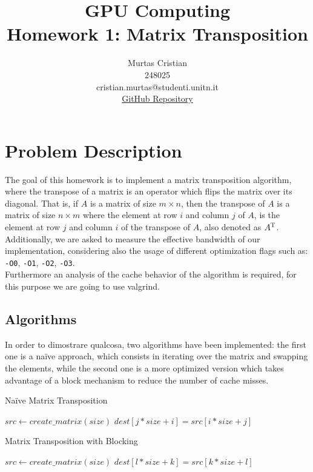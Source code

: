 \documentclass{article}
\title{\textbf{GPU Computing} \\
    \large Homework 1: Matrix Transposition \\
}
\author{Murtas Cristian \\ 248025 \\ cristian.murtas@studenti.unitn.it \\
\href{https://github.com/SecondarySkyler/gpu-computing/tree/main/matrix_transposition}{GitHub Repository}
}
\begin{document}
\maketitle

\section{Problem Description}
The goal of this homework is to implement a matrix transposition algorithm, where the transpose of a matrix
is an operator which flips the matrix over its diagonal. That is, if $A$ is a matrix of size $m \times n$, then
the transpose of $A$ is a matrix of size $n \times m$ where the element at row $i$ and column $j$ of $A$, is the element at 
row $j$ and column $i$ of the transpose of $A$, also denoted as $A\textsuperscript{T}$. \\
Additionally, we are asked to measure the effective bandwidth of our implementation, considering also the
usage of different optimization flags such as: \texttt{-O0}, \texttt{-O1}, \texttt{-O2}, \texttt{-O3}. \\
Furthermore an analysis of the cache behavior of the algorithm is required, for this purpose we are going to use
valgrind.
\subsection{Algorithms}
In order to dimostrare qualcosa, two algorithms have been implemented: the first one is a na\"{i}ve approach, which
consists in iterating over the matrix and swapping the elements, while the second one is a more optimized version
which takes advantage of a block mechanism to reduce the number of cache misses.
\begin{algorithm}
    \caption{Na\"{i}ve Matrix Transposition}
    \begin{algorithmic}[1]
        \State $src \gets create\_matrix(size)$
                \State $dest[j * size + i] = src[i * size + j]$
            \EndFor
        \EndFor
    \end{algorithmic}
\end{algorithm}

\begin{algorithm}
    \caption{Matrix Transposition with Blocking}
    \begin{algorithmic}[1]
        \State $src \gets create\_matrix(size)$
                 
                        \State $dest[l * size + k] = src[k * size + l]$
                    \EndFor
                \EndFor
            \EndFor
        \EndFor
    \end{algorithmic}
\end{algorithm}
\end{document}
